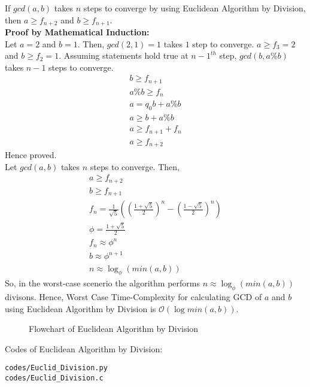 \documentclass[journal,12pt,twocolumn]{IEEEtran}
\begin{document}
If $gcd(a,b)$ takes $n$ steps to converge by using Euclidean Algorithm by Division, then $a \geq f_{n+2}$ and $b \geq f_{n+1}$.\\

\textbf{Proof by Mathematical Induction:}\\
Let $a = 2$ and $b = 1$. Then, $gcd(2,1) = 1$ takes $1$ step to converge. $a \geq f_{3} = 2$ and $b \geq f_{2} = 1$. Assuming statements hold true at ${n-1}^{th}$ step, $gcd(b,a\%b)$ takes $n-1$ steps to converge.
\begin{align}
b \geq f_{n+1}\\
a\%b \geq f_{n}\\
a = q_{0}b + a\%b\\
a \geq b + a\%b\\
a \geq f_{n+1} + f_{n}\\
a \geq f_{n+2}
\end{align}
Hence proved.\\

Let $gcd(a,b)$ takes $n$ steps to converge. Then,
\begin{align}
a \geq f_{n+2}\\
b \geq f_{n+1}\\
f_{n}=\frac{1}{\sqrt{5}}\left(\left(\frac{1+\sqrt{5}}{2}\right)^{n}-\left(\frac{1-\sqrt{5}}{2}\right)^{n}\right)\\
\phi = \frac{1+\sqrt{5}}{2}\\
f_{n} \approx \phi^{n}\\
b \approx \phi^{n+1}\\
n \approx \log_{\phi}{\left(min(a,b)\right)}
\end{align}
So, in the worst-case scenerio the algorithm performs $n \approx \log_{\phi}{\left(min(a,b)\right)} $ divisons. Hence, Worst Case Time-Complexity for calculating GCD of $a$ and  $b$ using Euclidean Algorithm by Division is $\mathcal{O}(\log min(a,b))$.\\

\begin{figure}[h!]
	\begin{center}
		\resizebox{\columnwidth/1}{!}{}
	\end{center}
	\caption{Flowchart of Euclidean Algorithm by Division}
	\label{fig:Input}
\end{figure}

Codes of Euclidean Algorithm by Division:
\begin{lstlisting}
codes/Euclid_Division.py
codes/Euclid_Division.c
\end{lstlisting}
\end{document}
